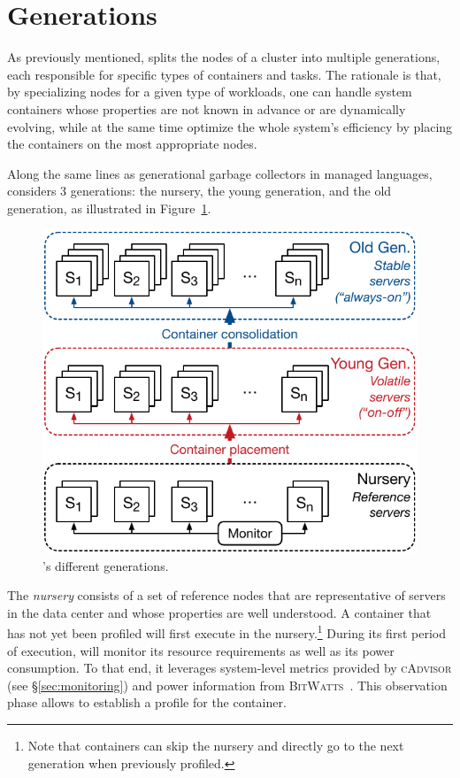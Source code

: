 
\section{Generations}
\label{sec:generations}

As previously mentioned, \GP splits the nodes of a cluster into multiple generations, each responsible for specific types of containers and tasks.
The rationale is that, by specializing nodes for a given type of workloads, one can handle system containers whose properties are not known in advance or are dynamically evolving, while at the same time optimize the whole system's efficiency by placing the containers on the most appropriate nodes.

Along the same lines as generational garbage collectors in managed languages, \GP considers 3 generations: the nursery, the young generation, and the old generation, as illustrated in Figure~\ref{fig:generations}.

\begin{figure}[H]
  \centering
  \includegraphics[width=.75\linewidth]{Figures/architecture}
  \caption{\GP's different generations.}
  \label{fig:generations}
\end{figure}


The \emph{nursery} consists of a set of reference nodes that are representative of servers in the data center and whose properties are well understood.
A container that has not yet been profiled will first execute in the nursery.\footnote{Note that containers can skip the nursery and directly go to the next generation when previously profiled.}
During its first period of execution, \GP will monitor its resource requirements as well as its power consumption.
To that end, it leverages system-level metrics provided by \textsc{cAdvisor} (see \S\ref{sec:monitoring}) and power information from \textsc{BitWatts}~\cite{DBLP:conf/eurosys/ColmantKFHRS15}.
This observation phase allows \GP to establish a profile for the container.


